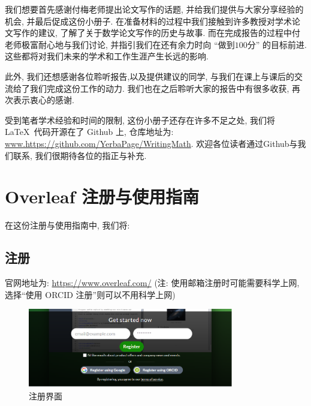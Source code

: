 \documentclass{booki}
\begin{document}
我们想要首先感谢付梅老师提出论文写作的话题, 并给我们提供与大家分享经验的机会, 并最后促成这份小册子. 在准备材料的过程中我们接触到许多教授对学术论文写作的建议, 了解了关于数学论文写作的历史与故事. 而在完成报告的过程中付老师极富耐心地与我们讨论, 并指引我们在还有余力时向 {``}做到$100$分{''} 的目标前进. 这些都将对我们未来的学术和工作生涯产生长远的影响.

此外, 我们还想感谢各位聆听报告,以及提供建议的同学, 与我们在课上与课后的交流给了我们完成这份工作的动力. 我们也在之后聆听大家的报告中有很多收获, 再次表示衷心的感谢.

受到笔者学术经验和时间的限制, 这份小册子还存在许多不足之处, 我们将 \LaTeX \ 代码开源在了 Github 上, 仓库地址为: \url{www.https://github.com/YerbaPage/WritingMath}. 欢迎各位读者通过Github与我们联系, 我们很期待各位的指正与补充.

{\printbibliography[title = {参考文献}]}
\appendix
\chapter{Overleaf 注册与使用指南}\label{overleafGuide}
{在这份注册与使用指南中, 我们将:
\begin{center}
    \noindent{}
\end{center}}

\section{注册}\label{header-n2}

官网地址为: \url{https://www.overleaf.com/} (注: 使用邮箱注册时可能需要科学上网, 选择``使用 ORCID 注册''则可以不用科学上网)

\begin{figure}[H]
    \centering
    \includegraphics[width=0.8\textwidth]{Guidepics/20210415183938.png}
    \caption{注册界面}
\end{figure}
\end{document}
